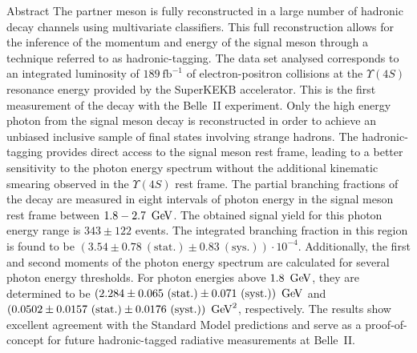\begin{abstractpage}{Abstract}
    The partner \B meson is fully reconstructed in a large number of hadronic decay channels using multivariate classifiers. 
    This full reconstruction allows for the inference of the momentum and energy of the signal \B meson through a technique referred to as hadronic-tagging.
    The data set analysed corresponds to an integrated luminosity of $189~\mathrm{fb}^{-1}$ of electron-positron collisions at the $\Upsilon(4S)$ resonance energy provided by the SuperKEKB accelerator. 
    This is the first measurement of the \BtoXsgamma decay with the Belle~II experiment.
    Only the high energy photon from the signal \B meson decay is reconstructed in order to achieve an unbiased inclusive sample of final states involving strange hadrons. 
    The hadronic-tagging provides direct access to the signal \B meson rest frame, leading to a better sensitivity to the photon energy spectrum without the additional kinematic smearing observed in the $\Upsilon(4S)$ rest frame.
    The partial branching fractions of the \BtoXsgamma decay are measured in eight intervals of photon energy in the signal \B meson rest frame between $1.8-2.7~\mathrm{\,Ge\kern -0.1em V}$. 
    The obtained signal yield for this photon energy range is $343 \pm 122$ events. 
    The integrated branching fraction in this region is found to be $(3.54 \pm 0.78~(\mathrm{stat.}) \pm 0.83~(\mathrm{sys.}))\cdot10^{-4}$.
    Additionally, the first and second moments of the photon energy spectrum are calculated for several photon energy thresholds. 
    For photon energies above $1.8~\mathrm{\,Ge\kern -0.1em V}$, they are determined to be $(2.284 \pm 0.065~(\mathrm{stat.})\pm 0.071~(\mathrm{syst.}))~\mathrm{\,Ge\kern -0.1em V}$ and $(0.0502 \pm 0.0157~(\mathrm{stat.}) \pm 0.0176~(\mathrm{syst.}))~\mathrm{\,Ge\kern -0.1em V}^2$, respectively.
    The results show excellent agreement with the Standard Model predictions and serve as a proof-of-concept for future hadronic-tagged radiative measurements at Belle~II.
        
    \end{abstractpage}
